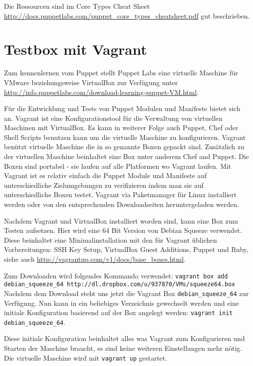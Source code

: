\documentclass[12pt,a4paper,ngerman]{article}
\begin{document}
Die Ressourcen sind im Core Types Cheat Sheet \url{http://docs.puppetlabs.com/puppet_core_types_cheatsheet.pdf} gut beschrieben.

\section{Testbox mit Vagrant}
Zum kennenlernen vom Puppet stellt Puppet Labs eine virtuelle Maschine für VMware beziehungsweise VirtualBox zur Verfügung unter \url{http://info.puppetlabs.com/download-learning-puppet-VM.html}. 

Für die Entwicklung und Tests von Puppet Modulen und Manifeste bietet sich \cite{vagrant} an. Vagrant ist eine Konfigurationstool für die Verwaltung von virtuellen Maschinen mit VirtualBox. Es kann in weiterer Folge auch Puppet, Chef oder Shell Scripts benutzen kann um die virtuelle Maschine zu konfigurieren. Vagrant benützt virtuelle Maschine die in so genannte Boxen gepackt sind. Zusätzlich zu der virtuellen Maschine beinhaltet eine Box unter anderem Chef and Puppet. Die Boxen sind portabel - sie laufen auf alle Platformen wo Vagrant laufen. Mit Vagrant ist es relativ einfach die Puppet Module und Manifeste auf unterschiedliche Zielumgebungen zu verifizieren indem man sie auf unterschiedliche Boxen testet. Vagrant via Paketmanager für Linux installiert werden oder von den entsprechenden Downloadseiten heruntergeladen werden.

Nachdem Vagrant und VirtualBox installiert worden sind, kann eine Box zum Testen aufsetzen. Hier wird eine 64 Bit Version von Debian Squeeze verwendet. Diese beinhaltet eine Minimalinstallation mit den für Vagrant üblichen Vorbereitungen: SSH Key Setup, VirtualBox Guest Additions, Puppet und Ruby, siehe auch \url{http://vagrantup.com/v1/docs/base_boxes.html}.

Zum Downloaden wird folgendes Kommando verwendet: \lstinline[language=bash]$vagrant box add debian_squeeze_64 http://dl.dropbox.com/u/937870/VMs/squeeze64.box$
Nachdem dem Download steht uns jetzt die  Vagrant Box \lstinline$debian_squeeze_64$ zur Verfügung. Nun kann in ein beliebiges Verzeichnis gewechselt werden und eine initiale Konfiguration basierend auf der Box angelegt werden: \lstinline[language=bash]$vagrant init debian_squeeze_64$.


Diese initiale Konfiguration beinhaltet alles was Vagrant zum Konfigurieren und Starten der Maschine braucht, es sind keine weiteren Einstellungen mehr nötig. Die virtuelle Maschine  wird mit \lstinline[language=bash]$vagrant up$ gestartet.
\end{document}
